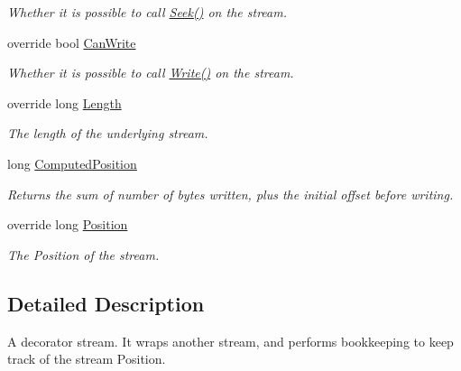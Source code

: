 \begin{DoxyCompactItemize}
\begin{DoxyCompactList}\small\item\em Whether it is possible to call \mbox{\hyperlink{class_super_tiled2_unity_1_1_ionic_1_1_zip_1_1_counting_stream_ad8cd38d7937983f8ba8859268fd17391}{Seek()}} on the stream. \end{DoxyCompactList}\item 
override bool \mbox{\hyperlink{class_super_tiled2_unity_1_1_ionic_1_1_zip_1_1_counting_stream_a0837bb56546671d1b5ddeff3cad49539}{Can\+Write}}
\begin{DoxyCompactList}\small\item\em Whether it is possible to call \mbox{\hyperlink{class_super_tiled2_unity_1_1_ionic_1_1_zip_1_1_counting_stream_a470131ef45d0fe5dd5494ad87ef0f78c}{Write()}} on the stream. \end{DoxyCompactList}\item 
override long \mbox{\hyperlink{class_super_tiled2_unity_1_1_ionic_1_1_zip_1_1_counting_stream_a18349dd6626dd4848c1f5315c5d66230}{Length}}
\begin{DoxyCompactList}\small\item\em The length of the underlying stream. \end{DoxyCompactList}\item 
long \mbox{\hyperlink{class_super_tiled2_unity_1_1_ionic_1_1_zip_1_1_counting_stream_acd4ab00a8317072e39cb5036ac54eb3e}{Computed\+Position}}
\begin{DoxyCompactList}\small\item\em Returns the sum of number of bytes written, plus the initial offset before writing. \end{DoxyCompactList}\item 
override long \mbox{\hyperlink{class_super_tiled2_unity_1_1_ionic_1_1_zip_1_1_counting_stream_aef51949370c4a72c46e2450517c46bb4}{Position}}
\begin{DoxyCompactList}\small\item\em The Position of the stream. \end{DoxyCompactList}\end{DoxyCompactItemize}


\subsection{Detailed Description}
A decorator stream. It wraps another stream, and performs bookkeeping to keep track of the stream Position. 

